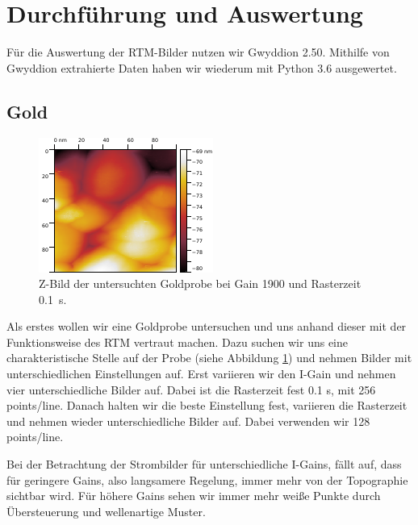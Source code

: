 \section{Durchführung und Auswertung}
Für die Auswertung der RTM-Bilder nutzen wir Gwyddion 2.50. Mithilfe von Gwyddion extrahierte Daten haben wir wiederum mit Python 3.6 ausgewertet. 

\subsection{Gold}

\begin{figure}[H]
\centering
\includegraphics[width=\textwidth]{../Gwyddion/Gold/GAIN_opt_Z_forward.pdf}
\caption{Z-Bild der untersuchten Goldprobe bei Gain 1900 und Rasterzeit \SI{0.1}{s}.}
\label{GAIN_opt_Z}
\end{figure}

Als erstes wollen wir eine Goldprobe untersuchen und uns anhand dieser mit der Funktionsweise des RTM vertraut machen. Dazu suchen wir uns eine charakteristische Stelle auf der Probe (siehe Abbildung \ref{GAIN_opt_Z}) und nehmen Bilder mit unterschiedlichen Einstellungen auf. Erst variieren wir den I-Gain und nehmen vier unterschiedliche Bilder auf. Dabei ist die Rasterzeit fest 0.1 s, mit 256 points/line. Danach halten wir die beste Einstellung fest, variieren die Rasterzeit und nehmen wieder unterschiedliche Bilder auf. Dabei verwenden wir 128 points/line.

Bei der Betrachtung der Strombilder für unterschiedliche I-Gains, fällt auf, dass für geringere Gains, also langsamere Regelung, immer mehr von der Topographie sichtbar wird. Für höhere Gains sehen wir immer mehr weiße Punkte durch Übersteuerung und wellenartige Muster.

